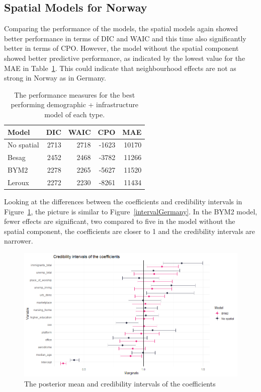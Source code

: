 \subsection{Spatial Models for Norway}
Comparing the performance of the models, the spatial models again showed better performance in terms of DIC and WAIC and this time also significantly better in terms of CPO. However, the model without the spatial component showed better predictive performance, as indicated by the lowest value for the MAE in Table~\ref{allNorway}. This could indicate that neighbourhood effects are not as strong in Norway as in Germany.
\begin{table}[H] 
\caption{The performance measures for the best performing demographic + infrastructure model of each type. \label{allNorway}}
\begin{tabular}{l r r r r}
\toprule
\textbf{Model}	& \textbf{DIC}	& \textbf{WAIC} & \textbf{CPO} & \textbf{MAE} \\
\midrule
No spatial & 2713 & 2718 & -1623 & 10170 \\
Besag  & 2452 & 2468 & -3782 & 11266 \\
BYM2 & 2278 & 2265 & -5627 & 11520\\
Leroux &  2272 & 2230 & -8261 & 11434\\
\bottomrule
\end{tabular}
\end{table}
Looking at the differences between the coefficients and credibility intervals in Figure~\ref{intervalNorway}, the picture is similar to Figure~\ref{intervalGermany}. In the BYM2 model, fewer effects are significant, two compared to five in the model without the spatial component, the coefficients are closer to 1 and the credibility intervals are narrower.
\begin{figure}[H]
    \centering
    \includegraphics[width = \textwidth]{intervals_norway.png}
    \caption{The posterior mean and credibility intervals of the coefficients}
    \label{intervalNorway}
\end{figure}
